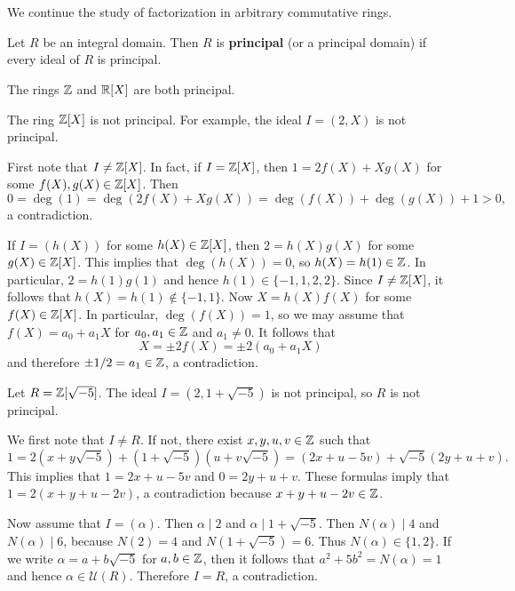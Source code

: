 \chapter{}

We continue the study of factorization in arbitrary commutative rings. 

\begin{definition}
	Let $R$ be an integral domain. Then $R$ is \textbf{principal} (or a principal domain) if
	every ideal of $R$ is principal.  
\end{definition}

The rings $\mathbb{Z}$ and $\mathbb{R}[X]$ are both principal. 

\begin{example}
	The ring $\mathbb{Z}[X]$ is not principal. For example, the ideal
	$I=(2,X)$ is not principal. 
	
	First note that $I\ne\mathbb{Z}[X]$. In fact, if $I=\mathbb{Z}[X]$, then 
	$1=2f(X)+Xg(X)$ for some $f(X),g(X)\in\mathbb{Z}[X]$. Then
	\[
	0=\deg(1)=\deg(2f(X)+Xg(X))=\deg(f(X))+\deg(g(X))+1>0,
	\]	
	a contradiction. 
	
	If $I=(h(X))$ for some $h(X)\in\mathbb{Z}[X]$, then $2=h(X)g(X)$ for some $g(X)\in\mathbb{Z}[X]$. This
	implies that $\deg(h(X))=0$, so $h(X)=h(1)\in\mathbb{Z}$. In particular, $2=h(1)g(1)$ and hence
	$h(1)\in\{-1,1,2,2\}$. Since $I\ne\mathbb{Z}[X]$, it follows that $h(X)=h(1)\not\in\{-1,1\}$. Now      
	$X=h(X)f(X)$ for some $f(X)\in\mathbb{Z}[X]$. In particular, $\deg(f(X))=1$, so
	we may assume that $f(X)=a_0+a_1X$ for $a_0,a_1\in\mathbb{Z}$ and $a_1\ne 0$. 	
	It follows that 
	\[
	X=\pm 2f(X)=\pm2(a_0+a_1X)
	\]
	and therefore $\pm1/2=a_1\in\mathbb{Z}$, a contradiction.
\end{example}

\begin{example}
	Let $R=\mathbb{Z}[\sqrt{-5}]$.  
	The ideal $I=(2,1+\sqrt{-5})$ is not principal, so $R$ is not principal. 
	
	We first note that $I\ne R$. If not, there exist $x,y,u,v\in\mathbb{Z}$ such that 
	\[
	1=2(x+y\sqrt{-5})+(1+\sqrt{-5})(u+v\sqrt{-5})=(2x+u-5v)+\sqrt{-5}(2y+u+v).
	\]
	This implies that $1=2x+u-5v$ and $0=2y+u+v$. These formulas imply that
	$1=2(x+y+u-2v)$, a contradiction because $x+y+u-2v\in\mathbb{Z}$. 
	
	Now assume that $I=(\alpha)$. Then $\alpha\mid 2$ and $\alpha\mid 1+\sqrt{-5}$. Then
	$N(\alpha)\mid 4$ and $N(\alpha)\mid 6$, because $N(2)=4$ and $N(1+\sqrt{-5})=6$. 
	Thus $N(\alpha)\in\{1,2\}$. If we write
	$\alpha=a+b\sqrt{-5}$ for $a,b\in\mathbb{Z}$, then it follows that 
	$a^2+5b^2=N(\alpha)=1$ and hence $\alpha\in\mathcal{U}(R)$. 
	Therefore $I=R$, a contradiction.   
\end{example}

